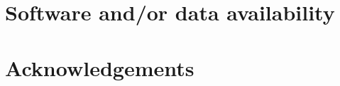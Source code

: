 \section*{Software and/or data availability}

\section*{Acknowledgements}

\appendix

\printcredits

% 

% 


